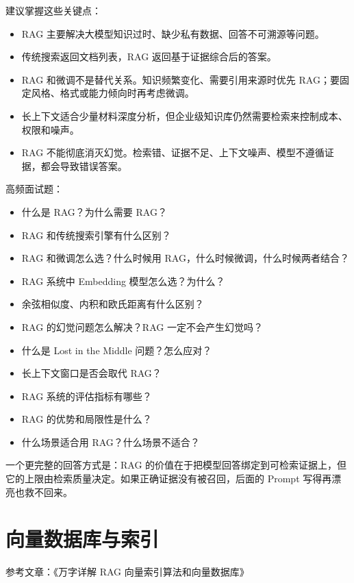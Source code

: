 \documentclass[9pt,a4paper,twocolumn]{ctexart}
\begin{document}
建议掌握这些关键点：


\begin{itemize}[itemsep=1pt, topsep=2pt]
  \item RAG 主要解决大模型知识过时、缺少私有数据、回答不可溯源等问题。
  \item 传统搜索返回文档列表，RAG 返回基于证据综合后的答案。
  \item RAG 和微调不是替代关系。知识频繁变化、需要引用来源时优先 RAG；要固定风格、格式或能力倾向时再考虑微调。
  \item 长上下文适合少量材料深度分析，但企业级知识库仍然需要检索来控制成本、权限和噪声。
  \item RAG 不能彻底消灭幻觉。检索错、证据不足、上下文噪声、模型不遵循证据，都会导致错误答案。
\end{itemize}


高频面试题：


\begin{itemize}[itemsep=1pt, topsep=2pt]
  \item 什么是 RAG？为什么需要 RAG？
  \item RAG 和传统搜索引擎有什么区别？
  \item RAG 和微调怎么选？什么时候用 RAG，什么时候微调，什么时候两者结合？
  \item RAG 系统中 Embedding 模型怎么选？为什么？
  \item 余弦相似度、内积和欧氏距离有什么区别？
  \item RAG 的幻觉问题怎么解决？RAG 一定不会产生幻觉吗？
  \item 什么是 Lost in the Middle 问题？怎么应对？
  \item 长上下文窗口是否会取代 RAG？
  \item RAG 系统的评估指标有哪些？
  \item RAG 的优势和局限性是什么？
  \item 什么场景适合用 RAG？什么场景不适合？
\end{itemize}


一个更完整的回答方式是：RAG 的价值在于把模型回答绑定到可检索证据上，但它的上限由检索质量决定。如果正确证据没有被召回，后面的 Prompt 写得再漂亮也救不回来。



\section*{向量数据库与索引}


参考文章：《万字详解 RAG 向量索引算法和向量数据库》
\end{document}

